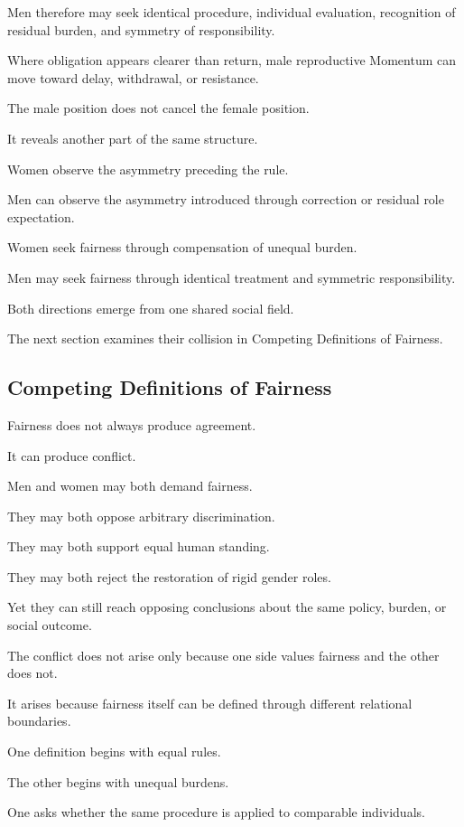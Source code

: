 Men therefore may seek identical procedure, individual evaluation, recognition of residual burden, and symmetry of responsibility.

Where obligation appears clearer than return, male reproductive Momentum can move toward delay, withdrawal, or resistance.

The male position does not cancel the female position.

It reveals another part of the same structure.

Women observe the asymmetry preceding the rule.

Men can observe the asymmetry introduced through correction or residual role expectation.

Women seek fairness through compensation of unequal burden.

Men may seek fairness through identical treatment and symmetric responsibility.

Both directions emerge from one shared social field.

The next section examines their collision in Competing Definitions of Fairness.

\subsection*{\textbf{Competing Definitions of Fairness}} 

Fairness does not always produce agreement.

It can produce conflict.

Men and women may both demand fairness.

They may both oppose arbitrary discrimination.

They may both support equal human standing.

They may both reject the restoration of rigid gender roles.

Yet they can still reach opposing conclusions about the same policy, burden, or social outcome.

The conflict does not arise only because one side values fairness and the other does not.

It arises because fairness itself can be defined through different relational boundaries.

One definition begins with equal rules.

The other begins with unequal burdens.

One asks whether the same procedure is applied to comparable individuals.

